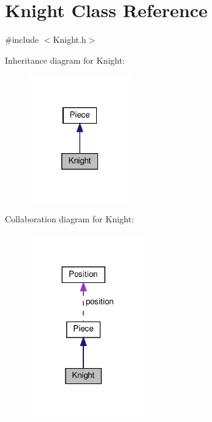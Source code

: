 \hypertarget{class_knight}{}\section{Knight Class Reference}
\label{class_knight}


{\ttfamily \#include $<$Knight.\+h$>$}



Inheritance diagram for Knight\+:\nopagebreak
\begin{figure}[H]
\begin{center}
\leavevmode
\includegraphics[width=124pt]{class_knight__inherit__graph}
\end{center}
\end{figure}


Collaboration diagram for Knight\+:\nopagebreak
\begin{figure}[H]
\begin{center}
\leavevmode
\includegraphics[width=143pt]{class_knight__coll__graph}
\end{center}
\end{figure}
